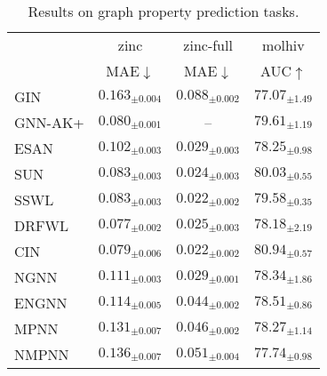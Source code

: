 \begin{table}[t]
\vskip -7pt
    \caption{Results on graph property prediction tasks.}\label{tab::zinc}
\vskip 7pt
    \centering
    \setlength{\tabcolsep}{1pt}
    \begin{tabular}{lccc}
    \toprule
        ~ & zinc & zinc-full & molhiv \\
     ~ & MAE$\downarrow$ & MAE$\downarrow$ & AUC$\uparrow$ \\
      \midrule
        GIN & $0.163_{\pm0.004}$ & $0.088_{\pm0.002}$ & $77.07_{\pm1.49}$ \\ 
        GNN-AK+ & $0.080_{\pm0.001}$ & – & $79.61_{\pm1.19}$ \\ 
        ESAN & $0.102_{\pm0.003}$ & $0.029_{\pm0.003}$ & $78.25_{\pm0.98}$ \\ 
        SUN & $0.083_{\pm0.003}$ & $0.024_{\pm0.003}$ & $80.03_{\pm0.55}$ \\ 
        SSWL & $0.083_{\pm0.003}$ & $0.022_{\pm0.002}$ & $79.58_{\pm0.35}$ \\ 
        DRFWL & $0.077_{\pm0.002}$ & $0.025_{\pm0.003}$ & $78.18_{\pm2.19}$ \\ 
        CIN & $0.079_{\pm0.006}$ & $0.022_{\pm0.002}$ & $80.94_{\pm0.57}$ \\ 
        NGNN & $0.111_{\pm0.003}$ & $0.029_{\pm0.001}$ & $78.34_{\pm1.86}$ \\
    \midrule
        ENGNN &$0.114_{\pm 0.005}$&$0.044_{\pm 0.002}$&$78.51_{\pm 0.86}$\\
        MPNN &$0.131_{\pm 0.007}$&$0.046_{\pm 0.002}$&$78.27_{\pm 1.14}$\\
        NMPNN &$0.136_{\pm 0.007}$&$0.051_{\pm 0.004}$&$77.74_{\pm 0.98}$\\
    \bottomrule
    \end{tabular}
    \vskip -10pt
\end{table}
